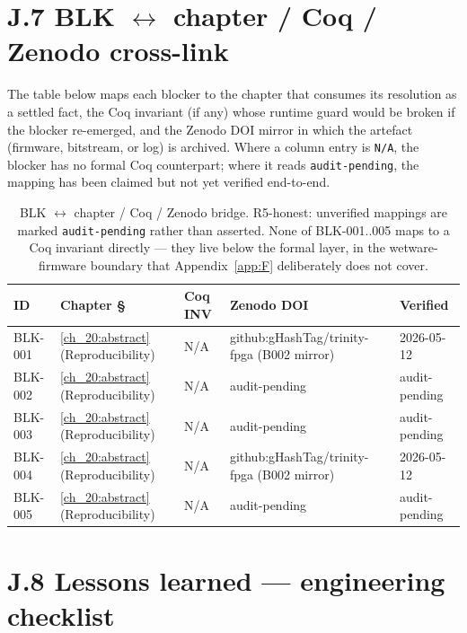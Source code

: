 \section*{J.7 BLK $\leftrightarrow$ chapter / Coq / Zenodo cross-link}
\label{sec:appJ-crosslink}

The table below maps each blocker to the chapter that consumes its
resolution as a settled fact, the Coq invariant (if any) whose runtime
guard would be broken if the blocker re-emerged, and the Zenodo DOI mirror
in which the artefact (firmware, bitstream, or log) is archived. Where a
column entry is \texttt{N/A}, the blocker has no formal Coq counterpart;
where it reads \texttt{audit-pending}, the mapping has been claimed but
not yet verified end-to-end.

\begin{table}[h]
\centering
\begin{tabular}{lllll}
\toprule
\textbf{ID} & \textbf{Chapter \S} & \textbf{Coq INV} & \textbf{Zenodo DOI} & \textbf{Verified} \\
\midrule
BLK-001 & \ref{ch_20:abstract} (Reproducibility) & N/A & github:gHashTag/trinity-fpga (B002 mirror) & 2026-05-12 \\
BLK-002 & \ref{ch_20:abstract} (Reproducibility) & N/A & audit-pending & audit-pending \\
BLK-003 & \ref{ch_20:abstract} (Reproducibility) & N/A & audit-pending & audit-pending \\
BLK-004 & \ref{ch_20:abstract} (Reproducibility) & N/A & github:gHashTag/trinity-fpga (B002 mirror) & 2026-05-12 \\
BLK-005 & \ref{ch_20:abstract} (Reproducibility) & N/A & audit-pending & audit-pending \\
\bottomrule
\end{tabular}
\caption{BLK $\leftrightarrow$ chapter / Coq / Zenodo bridge. R5-honest:
unverified mappings are marked \texttt{audit-pending} rather than asserted.
None of BLK-001..005 maps to a Coq invariant directly --- they live below
the formal layer, in the wetware-firmware boundary that Appendix~\ref{app:F}
deliberately does not cover.}
\end{table}

\section*{J.8 Lessons learned --- engineering checklist}
\label{sec:appJ-lessons}

